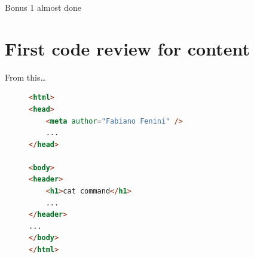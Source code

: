 \documentclass[10pt]{beamer}
\begin{document}
\begin{frame}[fragile]{Bonus 1 almost done}
\vfill{}\vfill
\end{frame}


\begin{frame}[standout]
\end{frame}


\section{First code review for content}

{
\begin{frame}
\end{frame}}


\begin{frame}[fragile]{From this…}
\begin{figure}[h]
\begin{lstlisting}[language=html]
<html>
<head>
    <meta author="Fabiano Fenini" />
    ...
</head>

<body>
<header>
    <h1>cat command</h1>
    ...
</header>
...
</body>
</html>
\end{lstlisting}
\end{figure}
\end{frame}
\end{document}
